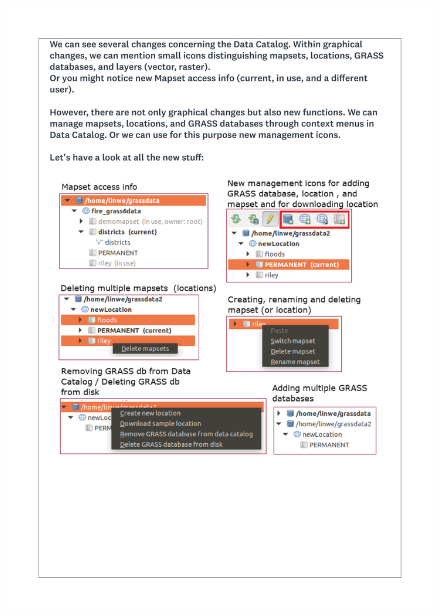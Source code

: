 \documentclass[a4paper,10pt,twoside]{article}
\begin{document}
 \newpage
 \begin{figure}[hbt!]
 \begin{center}
 \includegraphics[width=16cm]{../surveys/questionnaires/survey1_part1_page4_new_stuff.pdf}
 \end{center}
 \end{figure}
 
\end{document}

